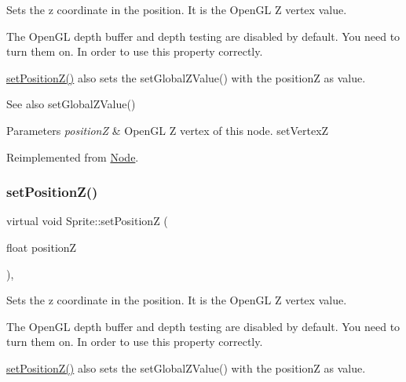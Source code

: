 Sets the \textquotesingle{}z\textquotesingle{} coordinate in the position. It is the Open\+GL Z vertex value.

The Open\+GL depth buffer and depth testing are disabled by default. You need to turn them on. In order to use this property correctly.

{\ttfamily \hyperlink{classSprite_ac22643ba4c10444cce30e0f100bfb041}{set\+Position\+Z()}} also sets the {\ttfamily set\+Global\+Z\+Value()} with the positionZ as value.

\begin{DoxySeeAlso}{See also}
{\ttfamily set\+Global\+Z\+Value()}
\end{DoxySeeAlso}

\begin{DoxyParams}{Parameters}
{\em positionZ} & Open\+GL Z vertex of this node.  set\+VertexZ \\
\hline
\end{DoxyParams}


Reimplemented from \hyperlink{classNode_aaea9bcbb6e5972122c590b930b5a90b9}{Node}.

\mbox{\label{classSprite_a3ebbeab90f8e3f136fa9cce2c85ee197}} 
\subsubsection{\texorpdfstring{set\+Position\+Z()}{setPositionZ()}\hspace{0.1cm}{\footnotesize\ttfamily [2/2]}}
{\footnotesize\ttfamily virtual void Sprite\+::set\+PositionZ (\begin{DoxyParamCaption}\item[{float}]{positionZ }\end{DoxyParamCaption})\hspace{0.3cm}{\ttfamily [override]}, {\ttfamily [virtual]}}

Sets the \textquotesingle{}z\textquotesingle{} coordinate in the position. It is the Open\+GL Z vertex value.

The Open\+GL depth buffer and depth testing are disabled by default. You need to turn them on. In order to use this property correctly.

{\ttfamily \hyperlink{classSprite_ac22643ba4c10444cce30e0f100bfb041}{set\+Position\+Z()}} also sets the {\ttfamily set\+Global\+Z\+Value()} with the positionZ as value.


